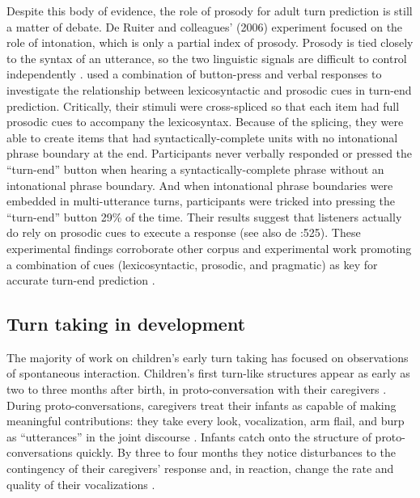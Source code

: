 \documentclass[authoryear, 12pt]{elsarticle}
\begin{document}
Despite this body of evidence, the role of prosody for adult turn prediction is still a matter of debate. De Ruiter and colleagues' (2006) experiment focused on the role of intonation, which is only a partial index of prosody. Prosody is tied closely to the syntax of an utterance, so the two linguistic signals are difficult to control independently \citep{ford1996}. \citet*{torreira2015} used a combination of button-press and verbal responses to investigate the relationship between lexicosyntactic and prosodic cues in turn-end prediction. Critically, their stimuli were cross-spliced so that each item had full prosodic cues to accompany the lexicosyntax. Because of the splicing, they were able to create items that had syntactically-complete units with no intonational phrase boundary at the end. Participants never verbally responded or pressed the ``turn-end'' button when hearing a syntactically-complete phrase without an intonational phrase boundary. And when intonational phrase boundaries were embedded in multi-utterance turns, participants were tricked into pressing the ``turn-end'' button 29\% of the time. Their results suggest that listeners actually do rely on prosodic cues to execute a response (see also de \citet{de-ruiter2006}:525). These experimental findings corroborate other corpus and experimental work promoting a combination of cues (lexicosyntactic, prosodic, and pragmatic) as key for accurate turn-end prediction \citep{duncan1972, ford1996, hirvenkari2013}. 

\subsection*{Turn taking in development}


The majority of work on children's early turn taking has focused on observations of spontaneous interaction. Children's first turn-like structures appear as early as two to three months after birth, in proto-conversation with their caregivers \citep{bruner1975, bruner1985}. During proto-conversations, caregivers treat their infants as capable of making meaningful contributions: they take every look, vocalization, arm flail, and burp as ``utterances'' in the joint discourse \citep{bateson1975, jaffe2001, snow1977}. Infants catch onto the structure of proto-conversations quickly. By three to four months they notice disturbances to the contingency of their caregivers' response and, in reaction, change the rate and quality of their vocalizations \citep{k-bloom1988, masataka1993, toda1993}. 
\end{document}
